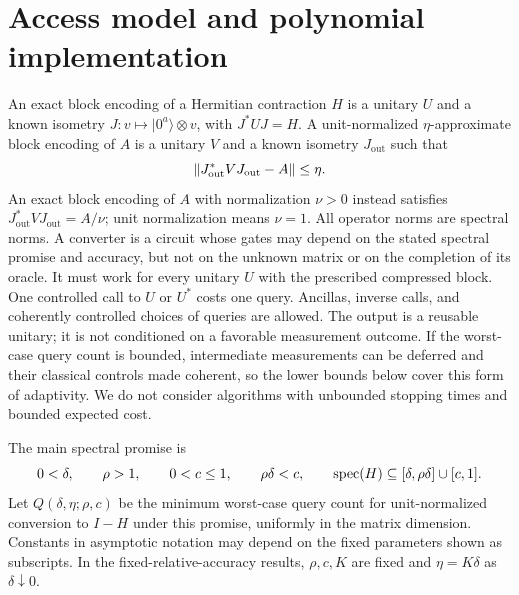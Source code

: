 \section{Access model and polynomial implementation}\label{sec:model}
An exact block encoding of a Hermitian contraction $H$ is a unitary $U$ and a known isometry $J\colon v\mapsto |0^a\rangle\otimes v$, with $J^*UJ=H$. A unit-normalized $\eta$-approximate block encoding of $A$ is a unitary $V$ and a known isometry $J_{\mathrm{out}}$ such that
\[
 \left\lVert J_{\mathrm{out}}^*VJ_{\mathrm{out}}-A\right\rVert\leq\eta.
\]
An exact block encoding of $A$ with normalization $\nu>0$ instead satisfies $J_{\mathrm{out}}^*VJ_{\mathrm{out}}=A/\nu$; unit normalization means $\nu=1$.
All operator norms are spectral norms. A converter is a circuit whose gates may depend on the stated spectral promise and accuracy, but not on the unknown matrix or on the completion of its oracle. It must work for every unitary $U$ with the prescribed compressed block. One controlled call to $U$ or $U^*$ costs one query. Ancillas, inverse calls, and coherently controlled choices of queries are allowed. The output is a reusable unitary; it is not conditioned on a favorable measurement outcome. If the worst-case query count is bounded, intermediate measurements can be deferred and their classical controls made coherent, so the lower bounds below cover this form of adaptivity. We do not consider algorithms with unbounded stopping times and bounded expected cost.

The main spectral promise is
\begin{equation}\label{eq:bands}
 0<\delta,\qquad \rho>1,\qquad 0<c\leq1,\qquad
 \rho\delta<c,\qquad
 \operatorname{spec}(H)\subseteq[\delta,\rho\delta]\cup[c,1].
\end{equation}
Let $Q(\delta,\eta;\rho,c)$ be the minimum worst-case query count for unit-normalized conversion to $I-H$ under this promise, uniformly in the matrix dimension. Constants in asymptotic notation may depend on the fixed parameters shown as subscripts. In the fixed-relative-accuracy results, $\rho,c,K$ are fixed and $\eta=K\delta$ as $\delta\downarrow0$.

